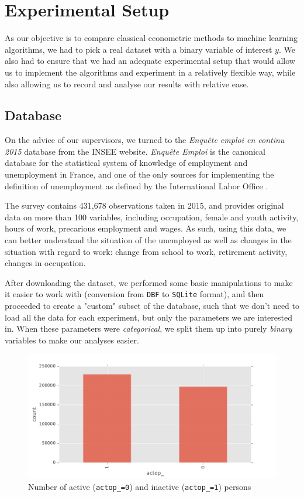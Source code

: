 \chapter{Experimental Setup}

As our objective is to compare classical econometric methods to machine learning algorithms, we had to pick a real dataset with a binary variable of interest $y$. We also had to ensure that we had an adequate experimental setup that would allow us to implement the algorithms and experiment in a relatively flexible way, while also allowing us to record and analyse our results with relative ease.

\section{Database}
On the advice of our supervisors, we turned to the \textit{Enqu\^ete emploi en continu 2015} database \cite{enquete} from the INSEE website. \textit{Enqu\^ete Emploi} is the canonical database for the statistical system of knowledge of employment and unemployment in France, and one of the only sources for implementing the definition of unemployment as defined by the International Labor Office \cite{ilo}.

The survey contains 431,678 observations taken in 2015, and provides original data on more than 100 variables, including occupation, female and youth activity, hours of work, precarious employment and wages. As such, using this data, we can better understand the situation of the unemployed as well as changes in the situation with regard to work: change from school to work, retirement activity, changes in occupation.

After downloading the dataset, we performed some basic manipulations to make it easier to work with (conversion from \texttt{DBF} to \texttt{SQLite} format), and then proceeded to create a "custom" subset of the database, such that we don't need to load all the data for each experiment, but only the parameters we are interested in. When these parameters were \textit{categorical}, we split them up into purely \textit{binary} variables to make our analyses easier.

\begin{figure}[!ht]
    \centering
    \includegraphics[scale=0.5]{img/database_actop_.pdf}
    \caption{Number of active (\texttt{actop\_=0}) and inactive (\texttt{actop\_=1}) persons}
    \label{fig:database_actop_}
\end{figure}


